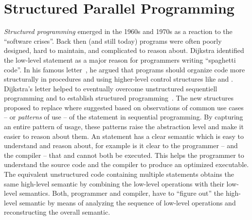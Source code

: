 \section{Structured Parallel Programming}
\emph{Structured programming} emerged in the 1960s and 1970s as a reaction to the ``software crises''.
Back then (and still today) programs were often poorly designed, hard to maintain, and complicated to reason about.
Dijkstra identified the low-level  statement as a major reason for programmers writing ``spaghetti code''.
In his famous letter~\cite{Dijkstra68a}, he argued that programs should organize code more structurally in procedures and using higher-level control structures like  and .
Dijkstra's letter helped to eventually overcome unstructured sequentiell programming and to establish structured programming~\cite{DahlDiHo1972}.
The new structures proposed to replace  where suggested based on observations of common use cases -- or \emph{patterns} of use -- of the  statement in sequential programming.
By capturing an entire pattern of usage, these patterns raise the abstraction level and make it easier to reason about them.
An  statement has a clear semantic which is easy to understand and reason about, for example is it clear to the programmer -- and the compiler -- that  and  cannot both be executed.
This helps the programmer to understand the source code and the compiler to produce an optimized executable.
The equivalent unstructured code containing multiple  statements obtains the same high-level semantic by combining the low-level operations with their low-level semantics.
Both, programmer and compiler, have to ``figure out'' the high-level semantic by means of analyzing the sequence of low-level operations and reconstructing the overall semantic.

